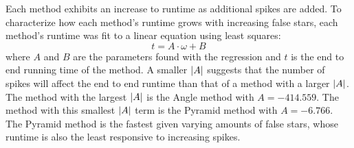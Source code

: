 %
%
%
Each method exhibits an increase to runtime as additional spikes are added.
To characterize how each method's runtime grows with increasing false stars, each method's runtime was fit to a linear
equation using least squares:
\begin{equation}
    t = A\cdot\omega + B
\end{equation}
where $A$ and $B$ are the parameters found with the regression and $t$ is the end to end running time of the method.
A smaller $\left| A \right|$ suggests that the number of spikes will affect the end to end runtime than that of a method with a
larger $\left| A \right|$.
The method with the largest $\left| A \right|$ is the Angle method with $A = -414.559$.
The method with this smallest $\left| A \right|$ term is the Pyramid method with $A = -6.766$.
The Pyramid method is the fastest given varying amounts of false stars, whose runtime is also the least responsive to
increasing spikes.

